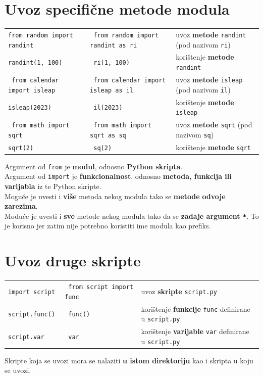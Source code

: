 \documentclass[10pt]{article}
\begin{document}
    \section*{\color{NavyBlue} Uvoz specifične metode modula}
    \begin{tabular}{|>{\tt}p{8.00cm}|>{\tt}p{8.00cm}|>{}p{8.00cm}|}
        \hline
        from random import randint & from random import randint as ri & uvoz \textbf{metode} \texttt{randint} (pod nazivom \texttt{ri})
        \\
        randint(1, 100) & ri(1, 100) & korištenje \textbf{metode} \texttt{randint}
        \\ \hline
        from calendar import isleap & from calendar import isleap as il & uvoz \textbf{metode} \texttt{isleap} (pod nazivom \texttt{il})
        \\
        isleap(2023) & il(2023) & korištenje \textbf{metode} \texttt{isleap}
        \\ \hline
        from math import sqrt & from math import sqrt as sq & uvoz \textbf{metode} \texttt{sqrt} (pod nazivom \texttt{sq})
        \\
        sqrt(2) & sq(2) & korištenje \textbf{metode} \texttt{sqrt}
        \\ \hline
    \end{tabular}
    \begin{center}
        Argument od \texttt{from} je \textbf{modul}, odnosno \textbf{Python skripta}.
        \\
        Argument od \texttt{import} je \textbf{funkcionalnost}, odnosno \textbf{metoda, funkcija ili varijabla} iz te Python skripte.
        \\
        Moguće je uvesti i \textbf{više} metoda nekog modula tako se \textbf{metode} \textbf{odvoje zarezima}.
        \\
        Moduće je uvesti i \textbf{sve} metode nekog modula tako da se \textbf{zadaje argument \texttt{*}}. To je korisno jer zatim nije potrebno koristiti ime modula kao prefiks.
    \end{center}

    \section*{\color{NavyBlue} Uvoz druge skripte}
    \begin{tabular}{|>{\tt}p{8.00cm}|>{\tt}p{8.00cm}|>{}p{8.00cm}|}
        \hline
        import script & from script import func & uvoz \textbf{skripte} \texttt{script.py}
        \\
        script.func() & func() & korištenje \textbf{funkcije} \texttt{func} definirane u \texttt{script.py}
        \\
        script.var & var & korištenje \textbf{varijable} \texttt{var} definirane u \texttt{script.py}
        \\ \hline
    \end{tabular}
    \begin{center}
        Skripte koja se uvozi mora se nalaziti \textbf{u istom direktoriju} kao i skripta u koju se uvozi.
    \end{center}
\end{document}
